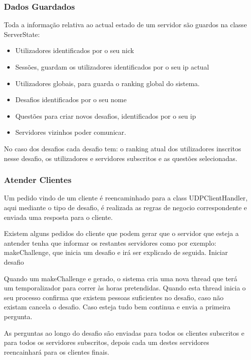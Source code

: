\documentclass[runningheads,a4paper]{llncs}
\begin{document}
\subsubsection{Dados Guardados}

Toda a informação relativa ao actual estado de um servidor são guardos na classe ServerState:
\begin{itemize}
  \item Utilizadores identificados por o seu nick
  \item Sessões, guardam os utilizadores identificados por o seu ip actual
  \item Utilizadores globais, para guarda o ranking global do sistema.
  \item Desafios identificados por o seu nome
  \item Questões para criar novos desafios, identificados por o seu ip
  \item Servidores vizinhos poder comunicar.
\end{itemize}

No caso dos desafios cada desafio tem: o ranking atual dos utilizadores inscritos nesse desafio, os utilizadores e servidores subscritos e as questões selecionadas.

\subsubsection{Atender Clientes}

Um pedido vindo de um cliente é reencaminhado para a class UDPClientHandler, aqui mediante o tipo de desafio, é realizada as regras de negocio correspondente e enviada uma resposta para o cliente.

Existem alguns pedidos do cliente que podem gerar que o servidor que esteja a antender tenha que informar os restantes servidores como por exemplo: makeChallenge, que inicia um desafio e irá ser explicado de seguida. 
Iniciar desafio

Quando um makeChallenge e gerado, o sistema cria uma nova thread que terá um temporalizador para correr às horas pretendidas. Quando esta thread inicia o seu processo confirma que existem pessoas suficientes no desafio, caso não existam cancela o desafio. Caso esteja tudo bem continua e envia a primeira pergunta.

As perguntas ao longo do desafio são enviadas para todos os clientes subscritos e para todos os servidores subscritos, depois cada um destes servidores reencainhará para os clientes finais.
\end{document}
